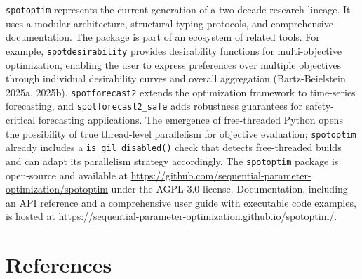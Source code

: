 \documentclass[
  twocolumn]{article}
\begin{document}
\texttt{spotoptim} represents the current generation of a two-decade
research lineage. It uses a modular architecture, structural typing
protocols, and comprehensive documentation. The package is part of an
ecosystem of related tools. For example, \texttt{spotdesirability}
provides desirability functions for multi-objective optimization,
enabling the user to express preferences over multiple objectives
through individual desirability curves and overall aggregation
(Bartz-Beielstein 2025a, 2025b), \texttt{spotforecast2} extends the
optimization framework to time-series forecasting, and
\texttt{spotforecast2\_safe} adds robustness guarantees for
safety-critical forecasting applications. The emergence of free-threaded
Python opens the possibility of true thread-level parallelism for
objective evaluation; \texttt{spotoptim} already includes a
\texttt{is\_gil\_disabled()} check that detects free-threaded builds and
can adapt its parallelism strategy accordingly. The \texttt{spotoptim}
package is open-source and available at
\url{https://github.com/sequential-parameter-optimization/spotoptim}
under the AGPL-3.0 license. Documentation, including an API reference
and a comprehensive user guide with executable code examples, is hosted
at \url{https://sequential-parameter-optimization.github.io/spotoptim/}.

\section*{References}\label{references}
\end{document}
